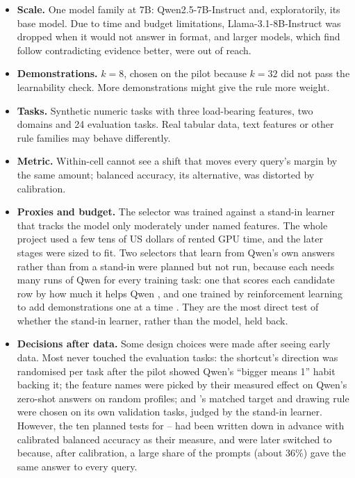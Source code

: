 \begin{itemize}[leftmargin=1.5em]
  \item \textbf{Scale.} One model family at 7B: Qwen2.5-7B-Instruct and, exploratorily, its base model. Due to time and budget limitations, Llama-3.1-8B-Instruct was dropped when it would not answer in format, and larger models, which \citet{wei2023larger} find follow contradicting evidence better, were out of reach.
  \item \textbf{Demonstrations.} $k = 8$, chosen on the pilot because $k = 32$ did not pass the learnability check. More demonstrations might give the rule more weight.
  \item \textbf{Tasks.} Synthetic numeric tasks with three load-bearing features, two domains and 24 evaluation tasks. Real tabular data, text features or other rule families may behave differently.
  \item \textbf{Metric.} Within-cell \AUROC cannot see a shift that moves every query's margin by the same amount; balanced accuracy, its alternative, was distorted by calibration.
  \item \textbf{Proxies and budget.} The selector was trained against a stand-in learner that tracks the model only moderately under named features. The whole project used a few tens of US dollars of rented GPU time, and the later stages were sized to fit. Two selectors that learn from Qwen's own answers rather than from a stand-in were planned but not run, because each needs many runs of Qwen for every training task: one that scores each candidate row by how much it helps Qwen \citep{chang2023data}, and one trained by reinforcement learning to add demonstrations one at a time \citep{zhang2022active}. They are the most direct test of whether the stand-in learner, rather than the model, held \sata back.
  \item \textbf{Decisions after data.} Some design choices were made after seeing early data. Most never touched the evaluation tasks: the shortcut's direction was randomised per task after the pilot showed Qwen's ``bigger means 1'' habit backing it; the feature names were picked by their measured effect on Qwen's zero-shot answers on random profiles; and \sata's matched target and drawing rule were chosen on its own validation tasks, judged by the stand-in learner. However, the ten planned tests for -- had been written down in advance with calibrated balanced accuracy as their measure, and were later switched to \AUROC because, after calibration, a large share of the prompts (about 36\%) gave the same answer to every query.
\end{itemize}

